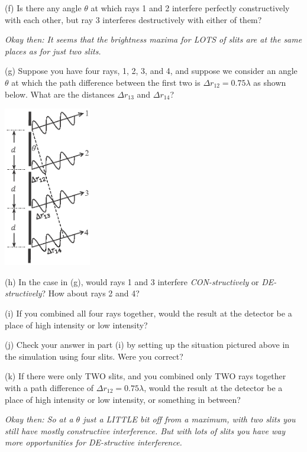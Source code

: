 (f) Is there any angle $\theta$ at which rays 1 and 2 interfere perfectly constructively with each other,  but ray 3 interferes destructively with either of them?
\answerspace{0.3in}

\textit{Okay then: It seems that the brightness maxima for LOTS of slits are at the same places as for just two slits.}

\pagebreak[2]
(g) Suppose you have four rays, 1, 2, 3, and 4, and suppose we consider an angle $\theta$ at which the path difference between the first two is $\Delta r_{12} = 0.75\lambda$ as shown below.  What are the distances $\Delta r_{13}$ and $\Delta r_{14}$?

\hspace{0.5in}\includegraphics[width=1.5in]{interference_of_light/four_slits.eps}

(h) In the case in (g), would rays 1 and 3 interfere \textit{CON-structively} or \textit{DE-structively}?  How about rays 2 and 4?
\answerspace{0.5in}

(i) If you combined all four rays together, would the result at the detector be a place of high intensity or low intensity? 
\answerspace{0.3in}

(j) Check your answer in part (i) by setting up the situation pictured above in the simulation using four slits.  Were you correct?
\answerspace{0.2in}


(k) If there were only TWO slits, and you combined only TWO rays together with a path difference of $\Delta r_{12} = 0.75\lambda$, would the result at the detector be a place of high intensity or low intensity, or something in between? 
\answerspace{0.4in}

\textit{Okay then: So at a $\theta$ just a LITTLE bit off from a maximum, with two slits you still have mostly constructive interference.  But with lots of slits you have way more opportunities for DE-structive interference.}

